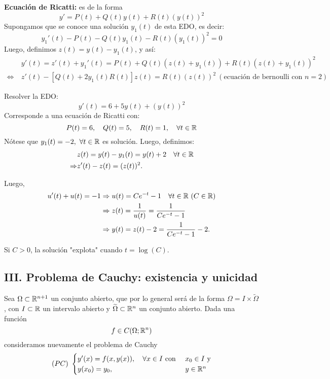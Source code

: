 	\noindent \textbf{Ecuación de Ricatti:} es de la forma
	\[ y' = P(t) + Q(t)y(t) + R(t)(y(t))^2 \]
	\noindent Supongamos que se conoce una solución $y_1(t)$ de esta EDO, es decir:
	\[ y_1'(t) - P(t) - Q(t)y_1(t) - R(t)(y_1(t))^2 = 0\]
	\noindent Luego, definimos $z(t) = y(t) - y_1(t)$, y así:
	\begin{align*}
		 & y'(t) = z'(t) + y_1'(t) = P(t) + Q(t)(z(t) + y_1(t)) + R(t)(z(t) + y_1(t))^2 \\
		\iff \ & z'(t) - [Q(t) + 2y_1(t) R(t)] z(t) = R(t)(z(t))^2 \ (\text{ecuación de bernoulli con } n=2)
	\end{align*}

	\begin{eg}
		Resolver la EDO:
		\[ y'(t) = 6 + 5y(t) + (y(t))^2 \]
		\noindent Corresponde a una ecuación de Ricatti con:
		\[ P(t)=6, \quad Q(t)=5,\quad R(t)=1,\quad \forall t \in \mathbb{R} \]
		\noindent Nótese que $y_1(t) = -2,\ \forall t \in \R$ es solución. Luego, definimos:
		\begin{align*}
			& z(t) = y(t) - y_1(t) = y(t) + 2 \quad \forall t \in \mathbb{R} \\
			\Rightarrow & z'(t) - z(t) = (z(t))^2
		.\end{align*}

		\noindent Luego,
		\begin{align*}
			u'(t) + u(t) = -1 & \Rightarrow u(t) = C e^{-t} - 1 \quad \forall t \in \mathbb{R} \ (C \in \mathbb{R}) \\
			& \Rightarrow z(t) = \frac{1}{u(t)} = \frac{1}{C e^{-t} -1} \\
			& \Rightarrow y(t) = z(t) - 2 = \frac{1}{C e^{-t} -1 }-2
		.\end{align*}
	\end{eg}
		\begin{note}
			Si $C>0$, la solución "explota" cuando $ t = \log (C)$. 
		\end{note}

		\subsection{III. Problema de Cauchy: existencia y unicidad}

		Sea $\Omega \subset \mathbb{R}^{n+1}$ un conjunto abierto, que por lo general será de la forma $ \Omega = I \times \widetilde{\Omega}$, con $I \subset \mathbb{R}$ un intervalo abierto y $\widetilde{\Omega}\subset \mathbb{R}^{n}$ un conjunto abierto. Dada una función
		\[ f \in C (\Omega;\mathbb{R}^n) \]
		\noindent consideramos nuevamente el problema de Cauchy
		\begin{align*} (PC) \ \begin{cases}
			 y'(x) = f(x,y(x)), \quad \forall x \in I \text{ con } & x_0 \in I \text{ y} \\
			 y(x_0) = y_0, & y \in \mathbb{R}^n
		\end{cases} \end{align*}

